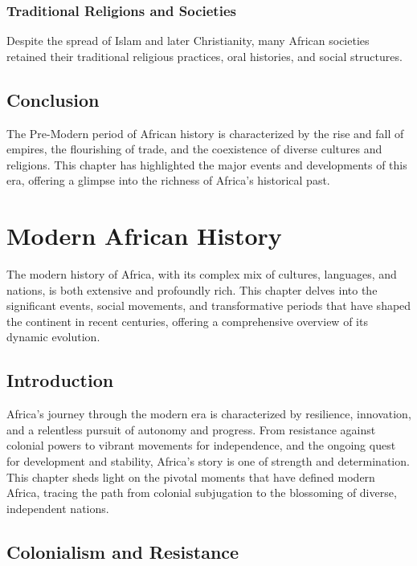 \documentclass[a4paper,12pt]{book}
\begin{document}
\subsection{Traditional Religions and Societies}
Despite the spread of Islam and later Christianity, many African societies retained their traditional religious practices, oral histories, and social structures.

\section{Conclusion}
\label{sec:conclusion-pre-modern-africa}

The Pre-Modern period of African history is characterized by the rise and fall of empires, the flourishing of trade, and the coexistence of diverse cultures and religions. This chapter has highlighted the major events and developments of this era, offering a glimpse into the richness of Africa's historical past.

\chapter{Modern African History}
\label{ch:modern-african-history}

The modern history of Africa, with its complex mix of cultures, languages, and nations, is both extensive and profoundly rich. This chapter delves into the significant events, social movements, and transformative periods that have shaped the continent in recent centuries, offering a comprehensive overview of its dynamic evolution.

\section{Introduction}
\label{sec:introduction-modern-africa}

Africa’s journey through the modern era is characterized by resilience, innovation, and a relentless pursuit of autonomy and progress. From resistance against colonial powers to vibrant movements for independence, and the ongoing quest for development and stability, Africa’s story is one of strength and determination. This chapter sheds light on the pivotal moments that have defined modern Africa, tracing the path from colonial subjugation to the blossoming of diverse, independent nations.

\section{Colonialism and Resistance}
\label{sec:colonialism-and-resistance}
\end{document}
